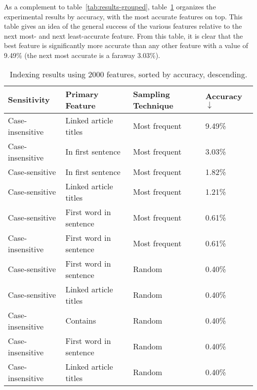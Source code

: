As a complement to table~\ref{tab:results-grouped}, table~\ref{tab:results-sorted} organizes the experimental results by accuracy, with the most accurate features on top.
This table gives an idea of the general success of the various features relative to the next most- and next least-accurate feature.
From this table, it is clear that the best feature is significantly more accurate than any other feature with a value of 9.49\% (the next most accurate is a faraway 3.03\%).


\begin{center}
\begin{table}[h]
\caption{Indexing results using 2000 features, sorted by accuracy, descending.}
\begin{tabular}{llll}
\label{tab:results-sorted}
\textbf{Sensitivity} & \textbf{Primary Feature}       & \textbf{Sampling Technique} & \textbf{Accuracy $\downarrow$} \\ \hline
Case-insensitive     & Linked article titles  & Most frequent               & 9.49\%             \\ \hline
Case-insensitive     & In first sentence      & Most frequent               & 3.03\%             \\ \hline
Case-sensitive       & In first sentence      & Most frequent               & 1.82\%             \\ \hline
Case-sensitive       & Linked article titles  & Most frequent               & 1.21\%             \\ \hline
Case-sensitive       & First word in sentence & Most frequent               & 0.61\%             \\ \hline
Case-insensitive     & First word in sentence & Most frequent               & 0.61\%             \\ \hline
Case-sensitive       & First word in sentence & Random                      & 0.40\%             \\ \hline
Case-sensitive       & Linked article titles  & Random                      & 0.40\%             \\ \hline
Case-insensitive     & Contains               & Random                      & 0.40\%             \\ \hline
Case-insensitive     & First word in sentence & Random                      & 0.40\%             \\ \hline
Case-insensitive     & Linked article titles  & Random                      & 0.40\%             \\ \hline

\end{tabular}
\end{table}
\end{center}
